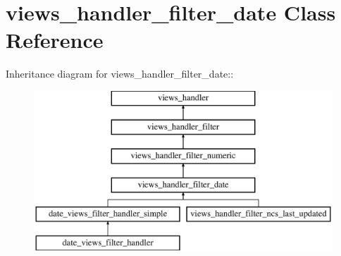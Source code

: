 \hypertarget{classviews__handler__filter__date}{
\section{views\_\-handler\_\-filter\_\-date Class Reference}
\label{classviews__handler__filter__date}
}
Inheritance diagram for views\_\-handler\_\-filter\_\-date::\begin{figure}[H]
\begin{center}
\leavevmode
\includegraphics[height=6cm]{classviews__handler__filter__date}
\end{center}
\end{figure}
